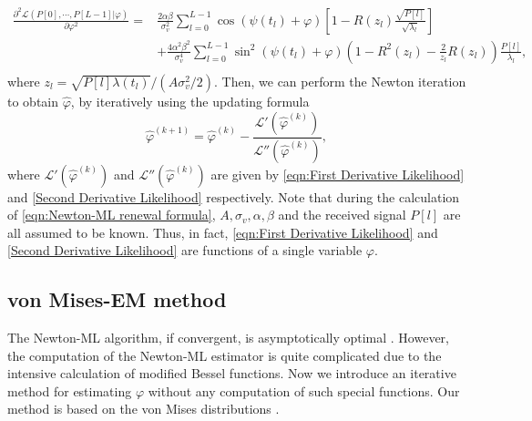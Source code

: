 \documentclass[journal,twocolumn]{IEEEtran}
\theoremstyle{nonumberplain}
\begin{document}
    \else 
        \begin{equation}
            \begin{aligned}
            \frac{\partial^2 \mathcal{L}(P[0],\cdots,P[L-1] | \varphi)}{\partial \varphi^2}  = &  \frac{2\alpha\beta}{\sigma_v^2} \sum_{l=0}^{L-1}{\cos(\psi(t_l)+\varphi)}\left[1 - R\left(z_l\right) \frac{\sqrt{P[l]}}{\sqrt{\lambda_l}}\right] \\
            & +\frac{4\alpha^2\beta^2}{\sigma_v^4}\sum_{l=0}^{L-1}{\sin^2(\psi(t_l)+\varphi) \left(1-R^2(z_l) -\frac{2}{z_l}R(z_l)\right)\frac{P[l]}{\lambda_l} },\\
            \end{aligned}
            \label{Second Derivative Likelihood}
        \end{equation}
    \fi
    where $z_l = \sqrt{P[l]\lambda(t_l)}/(A\sigma_v^2/2)$.
    Then, we can perform the Newton iteration to obtain $\hat{\varphi}$, by iteratively using the updating formula
    \begin{equation}
        \hat{\varphi}^{(k+1)} = \hat{\varphi}^{(k)} - \frac{\mathcal{L}'(\hat{\varphi}^{(k)})}{\mathcal{L}''(\hat{\varphi}^{(k)})},
        \label{eqn:Newton-ML renewal formula}
    \end{equation}
    where $\mathcal{L}'(\hat{\varphi}^{(k)})$ and $\mathcal{L}''(\hat{\varphi}^{(k)})$ are given by \eqref{eqn:First Derivative Likelihood} and \eqref{Second Derivative Likelihood} respectively. Note that during the calculation of \eqref{eqn:Newton-ML renewal formula}, $A, \sigma_v, \alpha, \beta$ and the received signal $P[l]$ are all assumed to be known. Thus, in fact,  \eqref{eqn:First Derivative Likelihood} and \eqref{Second Derivative Likelihood} are functions of a single variable $\varphi$. 

\subsection{von Mises-EM method}    \label{von Mises-EM method}
    The Newton-ML algorithm, if convergent, is asymptotically optimal \cite{casella2021statistical}. 
    However, the computation of the Newton-ML estimator is quite complicated due to the intensive calculation of modified Bessel functions. 
    Now we introduce an iterative method for estimating $\varphi$ without any computation of such special functions.
    Our method is based on the von Mises distributions \cite{gatto2007generalized}.
\end{document}
